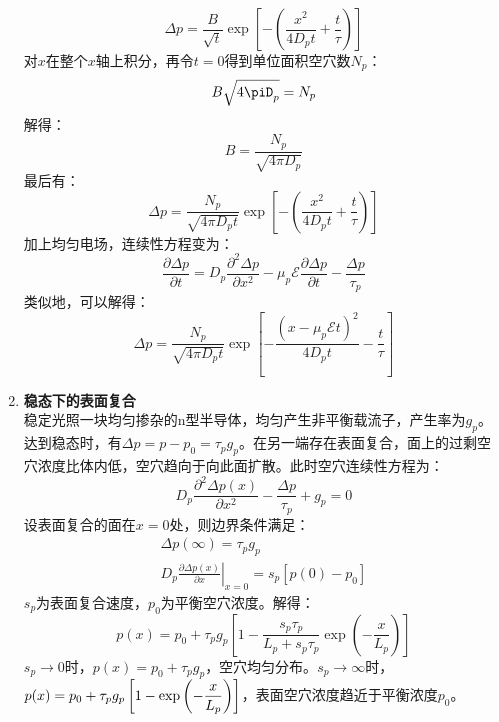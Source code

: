 \begin{enumerate}
\begin{equation}
        \Delta p=\frac{B}{\sqrt{t}}\exp{\left[-\left(\frac{x^2}{4D_pt}+\frac{t}{\tau}\right)\right]}
    \end{equation}
    对$x$在整个$x$轴上积分，再令$t=0$得到单位面积空穴数$N_p$：
    \begin{equation}
        B\sqrt{4\piD_p}=N_p
    \end{equation}
    解得：
    \begin{equation}
        B=\frac{N_p}{\sqrt{4\pi D_p}}
    \end{equation}
    最后有：
    \begin{equation}
        \Delta p=\frac{N_p}{\sqrt{4\pi D_pt}}\exp{\left[-\left(\frac{x^2}{4D_pt}+\frac{t}{\tau}\right)\right]}
    \end{equation}
    加上均匀电场，连续性方程变为：
    \begin{equation}
        \frac{\partial \Delta p}{\partial t}=D_p\frac{\partial^2 \Delta p}{\partial x^2}-\mu_p\mathscr{E}\frac{\partial \Delta p}{\partial t}-\frac{\Delta p}{\tau_p}
    \end{equation}
    类似地，可以解得：
    \begin{equation}
        \Delta p=\frac{N_p}{\sqrt{4\pi D_pt}}\exp{\left[-\frac{(x-\mu_p\mathscr{E}t)^2}{4D_pt}-\frac{t}{\tau}\right]}
    \end{equation}
    \item \textbf{稳态下的表面复合}\\
    稳定光照一块均匀掺杂的n型半导体，均匀产生非平衡载流子，产生率为$g_p$。达到稳态时，有$\Delta p=p-p_0=\tau_p g_p$。在另一端存在表面复合，面上的过剩空穴浓度比体内低，空穴趋向于向此面扩散。此时空穴连续性方程为：
    \begin{equation}
        D_p\frac{\partial^2 \Delta p(x)}{\partial x^2}-\frac{\Delta p}{\tau_p}+g_p=0
    \end{equation}
    设表面复合的面在$x=0$处，则边界条件满足：
    \begin{align}
        \Delta p(\infty)=\tau_pg_p\\
        D_p\left.\frac{\partial \Delta p(x)}{\partial x}\right|_{x=0}=s_p[p(0)-p_0]
    \end{align}
    $s_p$为表面复合速度，$p_0$为平衡空穴浓度。解得：
    \begin{equation}
        p(x)=p_0+\tau_pg_p\left[1-\frac{s_p\tau_p}{L_p+s_p\tau_p}\exp{\left(-\frac{x}{L_p}\right)}\right]
    \end{equation}
    $s_p\rightarrow 0$时，$p(x)=p_0+\tau_pg_p$，空穴均匀分布。$s_p\rightarrow \infty$时，$\displaystyle p(x)=p_0+\tau_pg_p\left[1-\exp{\left(-\frac{x}{L_p}\right)}\right]$，表面空穴浓度趋近于平衡浓度$p_0$。
\end{enumerate}

